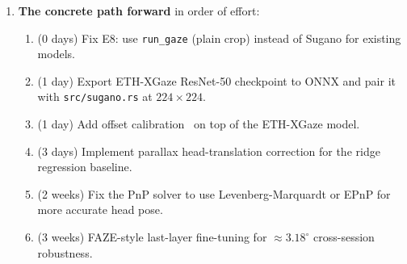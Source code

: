 \documentclass[11pt,a4paper]{article}
\begin{document}
\begin{enumerate}
  \item \textbf{The concrete path forward} in order of effort:
  \begin{enumerate}
    \item (0 days) Fix E8: use \texttt{run\_gaze} (plain crop) instead of Sugano for existing models.
    \item (1 day) Export ETH-XGaze ResNet-50 checkpoint to ONNX and pair it with \texttt{src/sugano.rs} at $224\times224$.
    \item (1 day) Add offset calibration~\cite{chen2020offset} on top of the ETH-XGaze model.
    \item (3 days) Implement parallax head-translation correction for the ridge regression baseline.
    \item (2 weeks) Fix the PnP solver to use Levenberg-Marquardt or EPnP for more accurate head pose.
    \item (3 weeks) FAZE-style last-layer fine-tuning for $\approx3.18^\circ$ cross-session robustness.
  \end{enumerate}
\end{enumerate}




\end{document}
